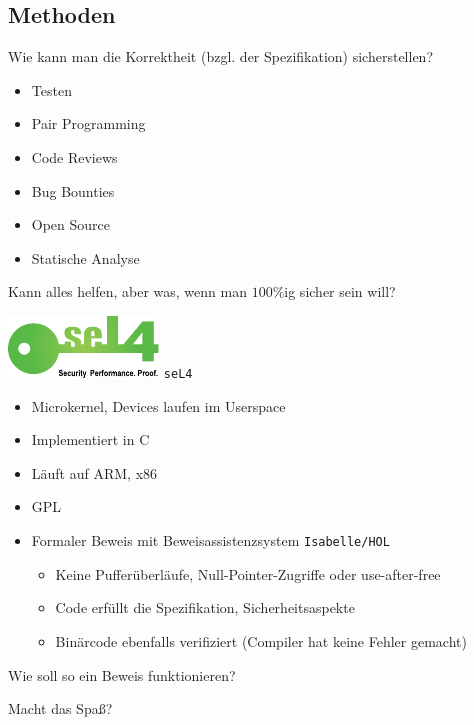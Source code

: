 \documentclass[aspectratio=169]{beamer}
\begin{document}
\subsection{Methoden}
\begin{frame}
  Wie kann man die Korrektheit (bzgl. der Spezifikation) sicherstellen?
  \begin{itemize}
  \item Testen
  \item Pair Programming
  \item Code Reviews
  \item Bug Bounties
  \item Open Source
  \item Statische Analyse \pause
  \end{itemize}
  \vfill
  Kann alles helfen, aber was, wenn man $100\%$ig sicher sein will? 
\end{frame}
\begin{frame}
  \begin{center}
    \includegraphics[width=4.0cm]{sel4_logo.pdf}
    \Large{\texttt{seL4}}
  \end{center}
  \begin{itemize}
  \item Microkernel, Devices laufen im Userspace
  \item Implementiert in C
  \item Läuft auf ARM, x86
  \item GPL
  \item Formaler Beweis mit Beweisassistenzsystem \texttt{Isabelle/HOL}
    \begin{itemize}
    \item Keine Pufferüberläufe, Null-Pointer-Zugriffe oder use-after-free
    \item Code erfüllt die Spezifikation, Sicherheitsaspekte
    \item Binärcode ebenfalls verifiziert (Compiler hat keine Fehler gemacht)
    \end{itemize}
  \end{itemize}
\end{frame}
\begin{frame}
  \begin{center}
    \Large{Wie soll so ein Beweis funktionieren?}
  \end{center}
  \pause
  \vfill
  \begin{center}
    \Large{Macht das Spaß?}
  \end{center}  
\end{frame}
\end{document}
